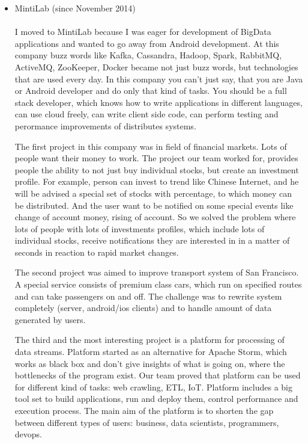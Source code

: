\documentclass{article}
\begin{document}
\begin{itemize}

\item MintiLab (since November 2014) \\\\
I moved to MintiLab because I was eager for development of BigData applications and wanted to go away from Android development. At this company buzz words like Kafka, Cassandra, Hadoop, Spark, RabbitMQ, ActiveMQ, ZooKeeper, Docker became not just buzz words, but technologies that are used every day. In this company you can't just say, that you are Java or Android developer and do only that kind of tasks. You should be a full stack developer, which knows how to write applications in different languages, can use cloud freely, can write client side code, can perform testing and perormance improvements of distributes systems.

The first project in this company was in field of financial markets. Lots of people want their money to work. The project our team worked for, provides people the ability to not just buy individual stocks, but create an investment profile. For example, person can invest to trend like Chinese Internet, and he will be advised a special set of stocks with percentage, to which money can be distributed. And the user want to be notified on some special events like change of account money, rising of account. So we solved the problem where lots of people with lots of investments profiles, which include lots of individual stocks, receive notifications they are interested in in a matter of seconds in reaction to rapid market changes.

The second project was aimed to improve transport system of San Francisco. A special service consists of premium class cars, which run on specified routes and can take passengers on and off. The challenge was to rewrite system completely (server, android/ios clients) and to handle amount of data generated by users.

The third and the most interesting project is a platform for processing of data streams. Platform started as an alternative for Apache Storm, which works as black box and don't give insights of what is going on, where the bottlenecks of the program exist. Our team proved that platform can be used for different kind of tasks: web crawling, ETL, IoT. Platform includes a big tool set to build applications, run and deploy them, control performance and execution process. The main aim of the platform is to shorten the gap between different types of users: business, data scientists, programmers, devops.


\end{itemize}
\end{document}
